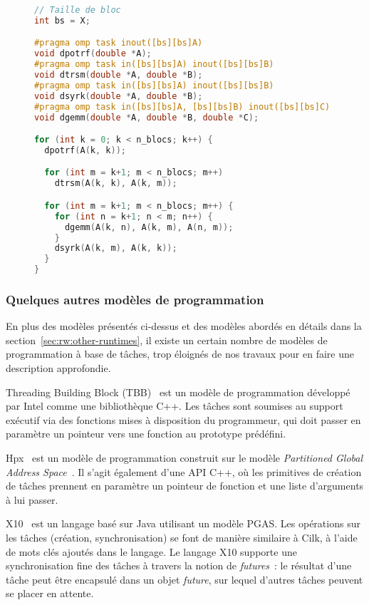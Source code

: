 \begin{figure}[h!]
\begin{lstlisting}[language=c++,caption=Cholesky exprimé en OmpSs,label=lst:context:cholesky-ompss]
// Taille de bloc
int bs = X;

#pragma omp task inout([bs][bs]A)
void dpotrf(double *A);
#pragma omp task in([bs][bs]A) inout([bs][bs]B)
void dtrsm(double *A, double *B);
#pragma omp task in([bs][bs]A) inout([bs][bs]B)
void dsyrk(double *A, double *B);
#pragma omp task in([bs][bs]A, [bs][bs]B) inout([bs][bs]C)
void dgemm(double *A, double *B, double *C);

for (int k = 0; k < n_blocs; k++) {
  dpotrf(A(k, k));

  for (int m = k+1; m < n_blocs; m++)
    dtrsm(A(k, k), A(k, m));

  for (int m = k+1; m < n_blocs; m++) {
    for (int n = k+1; n < m; n++) {
      dgemm(A(k, n), A(k, m), A(n, m));
    }
    dsyrk(A(k, m), A(k, k));
  }
}
\end{lstlisting}
\end{figure}


\subsubsection{Quelques autres modèles de programmation}

En plus des modèles présentés ci-dessus et des modèles abordés en détails dans la section~\ref{sec:rw:other-runtimes}, il existe un certain nombre de modèles de programmation à base de tâches, trop éloignés de nos travaux pour en faire une description approfondie.

Threading Building Block (TBB)~\cite{Reinders2007} est un modèle de programmation développé par Intel comme une bibliothèque C++.
Les tâches sont soumises au support exécutif via des fonctions mises à disposition du programmeur, qui doit passer en paramètre un pointeur vers une fonction au prototype prédéfini.

Hpx~\cite{Kaiser2014} est un modèle de programmation construit sur le modèle \emph{Partitioned Global Address Space}~\cite{PGAS}.
Il s'agit également d'une API C++, où les primitives de création de tâches prennent en paramètre un pointeur de fonction et une liste d'arguments à lui passer.

X10~\cite{Charles2005} est un langage basé sur Java utilisant un modèle PGAS.
Les opérations sur les tâches (création, synchronisation) se font de manière similaire à Cilk, à l'aide de mots clés ajoutés dans le langage.
Le langage X10 supporte une synchronisation fine des tâches à travers la notion de \emph{futures}~: le résultat d'une tâche peut être encapsulé dans un objet \emph{future}, sur lequel d'autres tâches peuvent se placer en attente.


